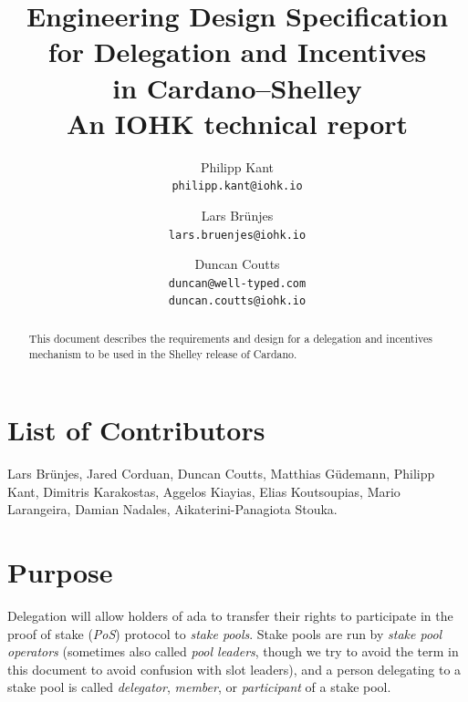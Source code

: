 \documentclass[11pt,a4paper,dvipsnames,twosided]{article}
\begin{document}
\title{Engineering Design Specification \\
  for Delegation and Incentives \\
  in Cardano--Shelley \\
  {\large \sc An IOHK technical report}}

\author{Philipp Kant   \\ {\small \texttt{philipp.kant@iohk.io}} \\
   \and Lars Br\"unjes \\ {\small \texttt{lars.bruenjes@iohk.io}} \\
   \and Duncan Coutts  \\ {\small \texttt{duncan@well-typed.com}} \\
                          {\small \texttt{duncan.coutts@iohk.io}}}
\maketitle

\begin{abstract}
This document describes the requirements and design for a delegation and
incentives mechanism to be used in the Shelley release of Cardano.
\end{abstract}

\section*{List of Contributors}
\label{acknowledgements}

Lars Br\"unjes, Jared Corduan, Duncan Coutts, Matthias G\"udemann,
Philipp Kant, Dimitris Karakostas, Aggelos Kiayias, Elias Koutsoupias,
Mario Larangeira, Damian Nadales, Aikaterini-Panagiota Stouka.


\section{Purpose}
\label{purpose}

Delegation will allow holders of ada to transfer their rights to participate in
the proof of stake (\emph{PoS}) protocol to \emph{stake pools}. Stake pools are
run by \emph{stake pool operators} (sometimes also called \emph{pool leaders},
though we try to avoid the term in this document to avoid confusion with slot
leaders), and a person delegating to a stake pool is called \emph{delegator},
\emph{member}, or \emph{participant} of a stake pool.
\end{document}
